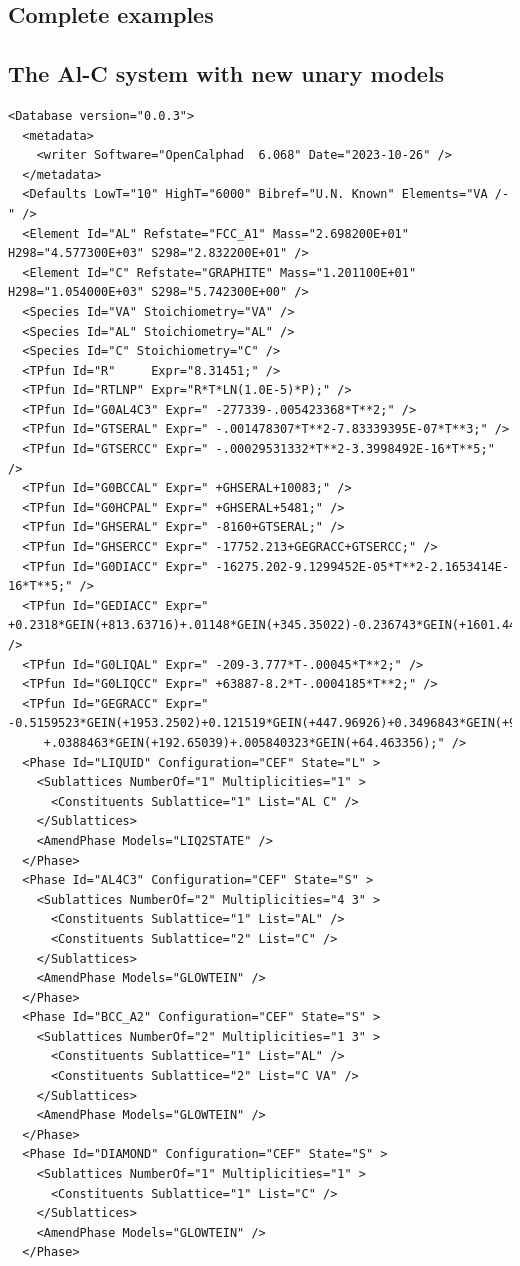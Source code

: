 \documentclass{article}
\begin{document}
\begin{appendices}
\newpage

\setcounter{equation}{0}
\renewcommand{\theequation}{D\arabic{equation}}
\setcounter{figure}{0}
\renewcommand{\thefigure}{D\arabic{figure}}

\section{Complete examples}\label{sec:complete}

\subsection{The Al-C system with new unary models}\label{sec:alc}

{\small
\begin{verbatim}
<Database version="0.0.3">
  <metadata>
    <writer Software="OpenCalphad  6.068" Date="2023-10-26" />
  </metadata>
  <Defaults LowT="10" HighT="6000" Bibref="U.N. Known" Elements="VA /-" />
  <Element Id="AL" Refstate="FCC_A1" Mass="2.698200E+01" H298="4.577300E+03" S298="2.832200E+01" />
  <Element Id="C" Refstate="GRAPHITE" Mass="1.201100E+01" H298="1.054000E+03" S298="5.742300E+00" />
  <Species Id="VA" Stoichiometry="VA" />
  <Species Id="AL" Stoichiometry="AL" />
  <Species Id="C" Stoichiometry="C" />
  <TPfun Id="R"     Expr="8.31451;" />
  <TPfun Id="RTLNP" Expr="R*T*LN(1.0E-5)*P);" />
  <TPfun Id="G0AL4C3" Expr=" -277339-.005423368*T**2;" /> 
  <TPfun Id="GTSERAL" Expr=" -.001478307*T**2-7.83339395E-07*T**3;" /> 
  <TPfun Id="GTSERCC" Expr=" -.00029531332*T**2-3.3998492E-16*T**5;" /> 
  <TPfun Id="G0BCCAL" Expr=" +GHSERAL+10083;" /> 
  <TPfun Id="G0HCPAL" Expr=" +GHSERAL+5481;" /> 
  <TPfun Id="GHSERAL" Expr=" -8160+GTSERAL;" /> 
  <TPfun Id="GHSERCC" Expr=" -17752.213+GEGRACC+GTSERCC;" /> 
  <TPfun Id="G0DIACC" Expr=" -16275.202-9.1299452E-05*T**2-2.1653414E-16*T**5;" /> 
  <TPfun Id="GEDIACC" Expr=" +0.2318*GEIN(+813.63716)+.01148*GEIN(+345.35022)-0.236743*GEIN(+1601.4467);" /> 
  <TPfun Id="G0LIQAL" Expr=" -209-3.777*T-.00045*T**2;" /> 
  <TPfun Id="G0LIQCC" Expr=" +63887-8.2*T-.0004185*T**2;" /> 
  <TPfun Id="GEGRACC" Expr=" -0.5159523*GEIN(+1953.2502)+0.121519*GEIN(+447.96926)+0.3496843*GEIN(+947.01605)
     +.0388463*GEIN(+192.65039)+.005840323*GEIN(+64.463356);" /> 
  <Phase Id="LIQUID" Configuration="CEF" State="L" >
    <Sublattices NumberOf="1" Multiplicities="1" >
      <Constituents Sublattice="1" List="AL C" />
    </Sublattices>
    <AmendPhase Models="LIQ2STATE" />
  </Phase>
  <Phase Id="AL4C3" Configuration="CEF" State="S" >
    <Sublattices NumberOf="2" Multiplicities="4 3" >
      <Constituents Sublattice="1" List="AL" />
      <Constituents Sublattice="2" List="C" />
    </Sublattices>
    <AmendPhase Models="GLOWTEIN" />
  </Phase>
  <Phase Id="BCC_A2" Configuration="CEF" State="S" >
    <Sublattices NumberOf="2" Multiplicities="1 3" >
      <Constituents Sublattice="1" List="AL" />
      <Constituents Sublattice="2" List="C VA" />
    </Sublattices>
    <AmendPhase Models="GLOWTEIN" />
  </Phase>
  <Phase Id="DIAMOND" Configuration="CEF" State="S" >
    <Sublattices NumberOf="1" Multiplicities="1" >
      <Constituents Sublattice="1" List="C" />
    </Sublattices>
    <AmendPhase Models="GLOWTEIN" />
  </Phase>



\end{verbatim}}
\end{appendices}
\end{document}
